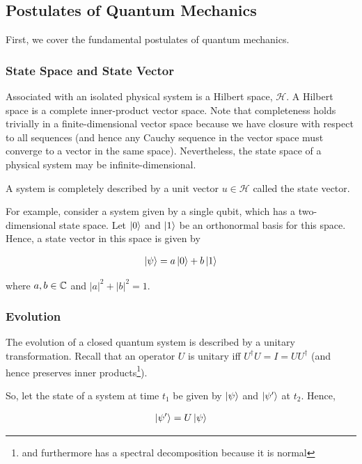 \documentclass[main.tex]{subfiles}
\begin{document}
\begin{subappendices}
\begin{exercise}
\end{exercise}

\subsection{Postulates of Quantum Mechanics}

First, we cover the fundamental postulates of quantum mechanics. 

\subsubsection{State Space and State Vector}

Associated with an isolated physical system is a Hilbert space, $\mathcal{H}$. A Hilbert space is a complete inner-product vector space. Note that completeness holds trivially in a finite-dimensional vector space because we have closure with respect to all sequences (and hence any Cauchy sequence in the vector space must converge to a vector in the same space). Nevertheless, the state space of a physical system may be infinite-dimensional. 

A system is completely described by a unit vector $u \in \mathcal{H}$ called the state vector.

For example, consider a system given by a single qubit, which has a two-dimensional state space. Let $\ket{0}$ and $\ket{1}$ be an orthonormal basis for this space. Hence, a state vector in this space is given by 

\begin{align*}
\ket{\psi} = a\ket{0} + b\ket{1}	
\end{align*}


where $a, b \in \mathbb{C}$ and $|a|^2 + |b|^2 = 1$. 

\subsubsection{Evolution}\label{post-discrete-evol}

The evolution of a closed quantum system is described by a unitary transformation. Recall that an operator $U$ is unitary iff $U^\dagger U = I = UU^\dagger$ (and hence preserves inner products\footnote{and furthermore has a spectral decomposition because it is normal}).

So, let the state of a system at time $t_1$ be given by $\ket{\psi}$ and $\ket{\psi'}$ at $t_2$. Hence,

\begin{align*}
\ket{\psi'} = U\ket{\psi}	
\end{align*}


\end{subappendices}
\end{document}
